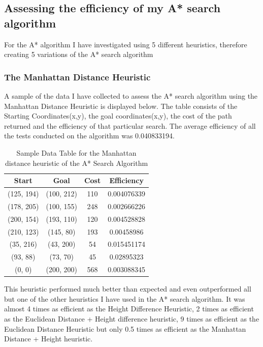 \documentclass[11pt,oneside]{article}
\begin{document}
\subsection{Assessing the efficiency of my A* search algorithm}
For the A* algorithm I have investigated using 5 different heuristics, therefore creating 5 variations of the A* search algorithm

\subsubsection{The Manhattan Distance Heuristic}
    A sample of the data I have collected to assess the A* search algorithm using the Manhattan Distance Heuristic is displayed below. The table consists of the Starting Coordinates(x,y), the goal coordinates(x,y), the cost of the path returned and the efficiency of that particular search. The average efficiency of all the tests conducted on the algorithm was 0.040833194.
 
\begin{table}[H]
    \centering
    \begin{tabular}{|c|c|c|c|}
        Start        & Goal       & Cost & Efficiency \\ \hline
        (125, 194)   & (100, 212) & 110 & 0.004076339 \\
        (178, 205)   & (100, 155) & 248 & 0.002666226 \\
        (200, 154)   & (193, 110) & 120 & 0.004528828 \\
        (210, 123)   & (145, 80)  & 193 & 0.00458986 \\
        (35, 216)    & (43, 200)  & 54 & 0.015451174 \\
        (93, 88)     & (73, 70)   & 45 & 0.02895323 \\
        (0, 0)       & (200, 200) & 568 & 0.003088345 \\
    \end{tabular}
    \caption{Sample Data Table for the Manhattan distance heuristic of the A* Search Algorithm}
    \label{tab:my_label}
\end{table} 
    
    This heuristic performed much better than expected and even outperformed all but one of the other heuristics I have used in the A* search algorithm. It was almost 4 times as efficient as the Height Difference Heuristic, 2 times as efficient as the Euclidean Distance + Height difference heuristic, 9 times as efficient as the Euclidean Distance Heuristic but only 0.5 times as efficient as the Manhattan Distance + Height heuristic.
    
\end{document}
